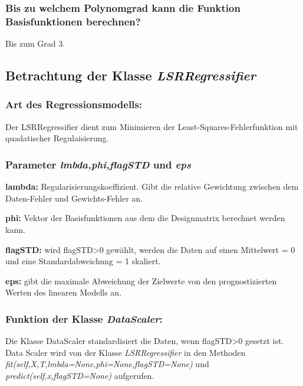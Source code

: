 \subsubsection{ Bis zu welchem Polynomgrad kann die Funktion Basisfunktionen berechnen? }

\noindent
Bis zum Grad 3.

\subsection{Betrachtung der Klasse \textit{LSRRegressifier}}

\subsubsection{ Art des Regressionsmodells: }

\noindent
Der LSRRegressifier dient zum Minimieren der Least-Squares-Fehlerfunktion mit quadatischer Regulaisierung.

\subsubsection{ Parameter \textit{lmbda,phi,flagSTD} und \textit{eps} }

\noindent
\textbf{lambda:} Regularisierungskoeffizient. Gibt die relative Gewichtung zwischen dem Daten-Fehler und Gewichts-Fehler an. 

\vspace{5px}
\noindent
\textbf{phi:} Vektor der Basisfunktionen aus dem die Designmatrix berechnet werden kann. 

\vspace{5px}
\noindent
\textbf{flagSTD:} wird flagSTD>0 gewählt, werden die Daten auf einen Mittelwert = 0 und eine Standardabweichung = 1 skaliert.  

\vspace{5px}
\noindent
\textbf{eps:} gibt die maximale Abweichung der Zielwerte von den prognostizierten Werten des linearen Modells an. 

\subsubsection{ Funktion der Klasse \textit{DataScaler}: }

\noindent
Die Klasse DataScaler standardisiert die Daten, wenn flagSTD>0 gesetzt ist. 
Data Scaler wird von der Klasse \textit{LSRRegressifier} in den Methoden \textit{fit(self,X,T,lmbda=None,phi=None,flagSTD=None)} und \textit{predict(self,x,flagSTD=None)} aufgerufen.

